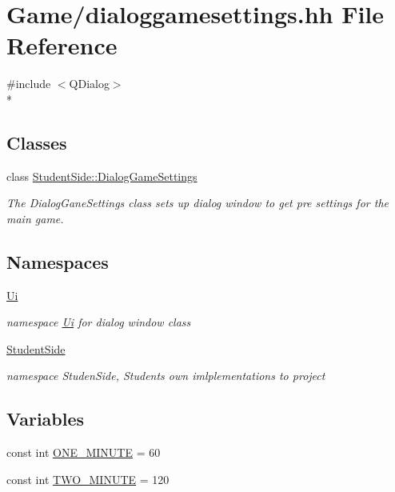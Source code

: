 \hypertarget{dialoggamesettings_8hh}{\section{Game/dialoggamesettings.hh File Reference}
\label{dialoggamesettings_8hh}
}
{\ttfamily \#include $<$Q\-Dialog$>$}\\*
\subsection*{Classes}
\begin{DoxyCompactItemize}
\item 
class \hyperlink{class_student_side_1_1_dialog_game_settings}{Student\-Side\-::\-Dialog\-Game\-Settings}
\begin{DoxyCompactList}\small\item\em The Dialog\-Gane\-Settings class sets up dialog window to get pre settings for the main game. \end{DoxyCompactList}\end{DoxyCompactItemize}
\subsection*{Namespaces}
\begin{DoxyCompactItemize}
\item 
\hyperlink{namespace_ui}{Ui}
\begin{DoxyCompactList}\small\item\em namespace \hyperlink{namespace_ui}{Ui} for dialog window class \end{DoxyCompactList}\item 
\hyperlink{namespace_student_side}{Student\-Side}
\begin{DoxyCompactList}\small\item\em namespace Studen\-Side, Students own imlplementations to project \end{DoxyCompactList}\end{DoxyCompactItemize}
\subsection*{Variables}
\begin{DoxyCompactItemize}
\item 
const int \hyperlink{dialoggamesettings_8hh_a8b40e2e7fdfe4c765aa9aaa6fec9b431}{O\-N\-E\-\_\-\-M\-I\-N\-U\-T\-E} = 60
\item 
const int \hyperlink{dialoggamesettings_8hh_aedc05529ef6072630839aed27d71b5ae}{T\-W\-O\-\_\-\-M\-I\-N\-U\-T\-E} = 120
\end{DoxyCompactItemize}



